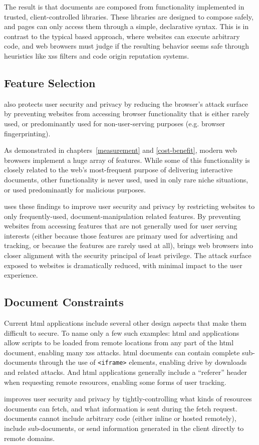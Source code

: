 The result is that \CDF documents are composed from functionality implemented
in trusted, client-controlled libraries.  These libraries are designed to
compose safely, and pages can only access them through a simple, declarative
syntax.  This is in contrast to the typical \JS based approach, where websites
can execute arbitrary code, and web browsers must judge if the resulting
behavior seems safe through heuristics like \gls{xss} filters and code origin
reputation systems.


\subsection{Feature Selection}
\label{future-web:design:feature-selection}
\CDF also protects user security and privacy by reducing the browser's attack
surface by preventing websites from accessing browser functionality that
is either rarely used, or predominantly used for non-user-serving purposes
(e.g. browser fingerprinting).

As demonstrated in chapters~\ref{measurement} and \ref{cost-benefit}, modern
web browsers implement a huge array of \WAPI features.  While some of this
functionality is closely related to the web's most-frequent purpose of delivering
interactive documents, other functionality is never used, used in only rare
niche situations, or used predominantly for malicious purposes.

\CDF uses these findings to improve user security and privacy by restricting
websites to only frequently-used, document-manipulation related \WAPI features.
By preventing websites from accessing features that are not generally
used for user serving interests (either because those features are
primary used for advertising and tracking, or because the features are rarely
used at all), \CDF brings web browsers into closer alignment with the security
principal of least privilege.  The attack surface exposed to websites is
dramatically reduced, with minimal impact to the user experience.


\subsection{Document Constraints}
\label{sec:design:doc-constraints}
Current \gls{html} applications include several other design aspects that make
them difficult to secure.  To name only a few such examples: \gls{html} and
\JS applications allow scripts to be loaded from remote locations from any
part of the \gls{html} document, enabling many \gls{xss} attacks.  \gls{html}
documents can contain complete sub-documents through the use of
\texttt{<iframe>} elements, enabling drive by downloads and related attacks.
And \gls{html} applications generally include a ``referer'' header when
requesting remote resources, enabling some forms of user tracking.

\CDF improves user security and privacy by tightly-controlling what kinds of
resources documents can fetch, and what information is sent during the fetch
request.  \CDF documents cannot include arbitrary code (either
inline or hosted remotely), include sub-documents, or send information
generated in the client directly to remote domains.

